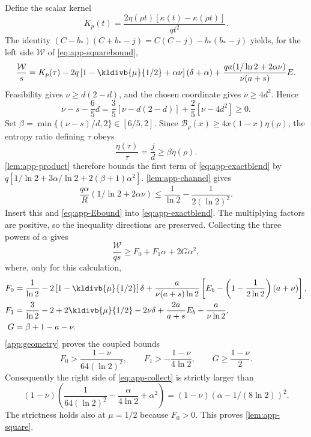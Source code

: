 Define the scalar kernel
\begin{equation}\label{eq:app-kernel}
 K_p(t)=\frac{2\eta(\rho t)[\kappa(t)-\kappa(\rho t)]}{qt^2}.
\end{equation}
The identity $(C-b_*)(C+b_*-j)=C(C-j)-b_*(b_*-j)$ yields, for the left side
$\mathcal W$ of \eqref{eq:app-squarebound},
\begin{equation}\label{eq:app-exactblend}
 \frac{\mathcal W}s=K_p(\tau)-2q\left[1-\kldivb{\mu}{1/2}+\alpha\nu\right](\delta+\alpha)
 +\frac{qa(1/\ln2+2\alpha \nu)}{\nu(a+s)}E.
\end{equation}
Feasibility gives $\nu\ge d(2-d)$, and the chosen coordinate gives $\nu\ge4d^2$. Hence
\[
 \nu-s-\frac65d
 =\frac35[\nu-d(2-d)]+\frac25[\nu-4d^2]\ge0.
\]
Set $\beta=\min\{(\nu-s)/d,2\}\in[6/5,2]$. Since $\mathcal B_\rho(x)\ge
4x(1-x)\eta(\rho)$, the entropy ratio defining $\tau$ obeys
\[
 \frac{\eta(\tau)}\tau=\frac jd\ge\beta \eta(\rho).
\]
\autoref{lem:app-product} therefore bounds the first term of \eqref{eq:app-exactblend} by
$q[1/\ln2+3\alpha/\ln2+2(\beta+1)\alpha^2]$. \autoref{lem:app-channel} gives
\[
 \frac{q\alpha}R(1/\ln2+2\alpha \nu)\le \frac1{\ln2}-\frac1{2(\ln2)^2}.
\]
Insert this and \eqref{eq:app-Ebound} into \eqref{eq:app-exactblend}. The
multiplying factors are positive, so the inequality directions are preserved.
Collecting the three powers of $\alpha$ gives
\begin{equation}\label{eq:app-collect}
 \frac{\mathcal W}{qs}\ge F_0+F_1\alpha+2G\alpha^2,
\end{equation}
where, only for this calculation,
\begin{align*}
 F_0&=\frac1{\ln2}-2\left[1-\kldivb{\mu}{1/2}\right]\delta
 +\frac{a}{\nu(a+s)\ln2}\left[E_b-\left(1-\frac1{2\ln2}\right)(a+\nu)\right],\\
 F_1&=\frac3{\ln2}-2+2\kldivb{\mu}{1/2}-2\nu\delta+\frac{2a}{a+s}E_b-\frac a{\nu\ln2},\\
 G&=\beta+1-a-\nu.
\end{align*}
\autoref{app:geometry} proves the coupled bounds
\[
 F_0>\frac{1-\nu}{64(\ln2)^2},\qquad F_1> -\frac{1-\nu}{4\ln2},\qquad G\ge\frac{1-\nu}{2}.
\]
Consequently the right side of \eqref{eq:app-collect} is strictly larger than
\[
 (1-\nu)\left(\frac1{64(\ln2)^2}-\frac\alpha{4\ln2}+\alpha^2\right)
 =(1-\nu)(\alpha-1/(8\ln2))^2.
\]
The strictness holds also at $\mu=1/2$ because $F_0>0$. This proves
\autoref{lem:app-square}.

